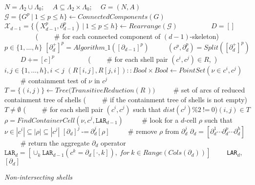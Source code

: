 \begin{algorithm}[h]
\SetAlgoNoLine
\DontPrintSemicolon
{}
$N = \Lambda_2 \cup \Lambda_0$; $\quad A \subseteq \Lambda_2\times\Lambda_0$; $\quad G = (N,A)$ $\qquad\qquad~$ {\color{blue}{\# initializations}}\; 
$\mathcal{G} = \{ G^p\ |\ 1\leq p\leq h \} \leftarrow \mathit{ConnectedComponents}(G)$  $\qquad\qquad~$ {\color{blue}{\# partition of $G$ into $h$ connected components}}\; 
$\mathcal{X}_{d-1} = \{ (X_{d-1}^p, \partial_{d-1}^p)\ |\ 1\leq p\leq h \} \leftarrow \mathit{Rearrange}(\mathcal{G})$  {$\qquad\qquad~$ {}}\;
$D = []$ $\qquad\qquad~$ {}\; 
\For({$\qquad${\color{blue} \# for each connected component of $(d-1)$-skeleton}}){$p \in \{ 1,\ldots, h \}$}{
	$[\partial_d^+]^p = \mathit{Algorithm\_1}([\partial_{d-1}]^p)$ $\qquad$ {\color{blue}{\# compute the minimal $d$-cycles of a component of complex}}\;
	$(c^p, \partial_d^p) = \mathit{Split}([\partial_{d}^+]^p)$ $\qquad$ {\color{blue}{\# split the component into the exterior $(d-1)$-cycle and the boundary $\partial_d^p$}}\;
	$D\ $+=$\ [c]^p$ $\qquad\qquad~$ {\color{blue}{\# append the boundary shell to the shell array}}\; 
}
\For({$\qquad${\color{blue} \# for each shell pair $(c^i,c^j)\in R$,\ }}){$i,j \in \{ 1,\ldots, h \},i<j$}{
	$(R[i,j],R[j,i])::\mathit{Bool}\times\mathit{Bool} \leftarrow \mathit{PointSet}(\nu\in c^i,c^j)$ {$\qquad${\color{blue} \# containment test of $\nu$ in $c^j$ }}\;
}
$T = \{ (i,j) \} \leftarrow \mathit{Tree(TransitiveReduction}(R\,))$ {$\qquad${\color{blue} \# set of arcs of reduced containment tree of shells }}\;
\If({$\qquad${\color{blue} \# if the containment tree of shells is not empty}}){$T \not=\emptyset$}{
	\For({$\qquad${\color{blue} \# for each shell pair $(c^i,c^j)$ such that $dist(c^j)\%2\ $!=$\ 0$}}){$(i,j) \in T$}{
		$\rho = \mathit{FindContainerCell}(\nu,c^j,\texttt{LAR}_{d-1})$ {$\qquad${\color{blue} \# look for a $d$-cell $\rho$ such that $\nu\in  |c^i| \subseteq |\rho|\subseteq |c^j|$ }}\;
		$[\partial_d]^j\ $-=$\ \partial_d^j[\rho]$ {$\qquad${\color{blue} \# remove $\rho$ from $\partial_d^j$ }}\;
	}
	}
$\partial_d = [\partial_d^1 \cdots \partial_d^p \cdots \partial_d^h]$ {$\qquad${\color{blue} \# return the aggregate $\partial_d$ operator }} \;
$\texttt{LAR}_{d} = [\cup_k \texttt{LAR}_{d-1}(c^k = \partial_d[\cdot,k]),\ \mathit{for\ } k\in\mathit{Range}(Cols(\partial_d))]\qquad$ {}\;
\Return \texttt{LAR}${}_{d}$, $[\partial_d]$

\caption{ \emph{Non-intersecting shells}}
\label{alg:four}
\end{algorithm}


